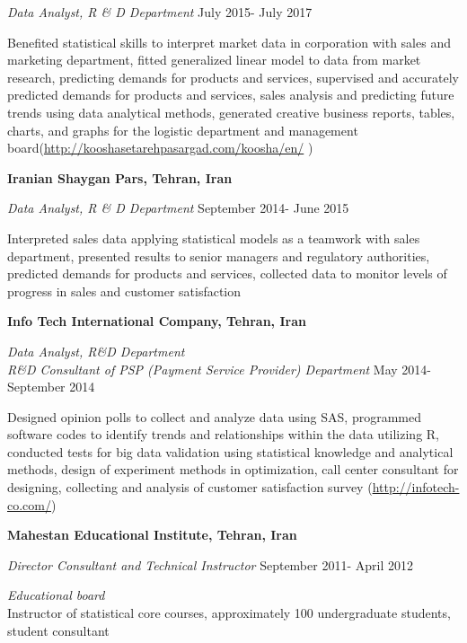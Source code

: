 \documentclass[margin,line]{res}
\begin{document}
\begin{resume}
{\em Data Analyst, R \& D Department} \hfill { July 2015- July 2017}

\vspace{-.3cm}
 Benefited statistical skills to interpret market data in corporation with sales and marketing department, fitted generalized linear model to data from market research, predicting demands for products and services, supervised and accurately predicted demands for products and services,  sales analysis and predicting future trends using data analytical methods,	generated creative business reports, tables, charts, and graphs for the logistic department and management board({\url{http://kooshasetarehpasargad.com/koosha/en/}} )



{\bf Iranian Shaygan Pars, Tehran, Iran }


{\em Data Analyst, R \& D Department} \hfill {  September 2014- June 2015}

\vspace{-.3cm}
Interpreted sales data applying statistical models as a teamwork with sales department,	presented results to senior managers and regulatory authorities, predicted demands for products and services, collected data to monitor levels of progress in sales and customer satisfaction


{\bf Info Tech International Company, Tehran, Iran }

{\em Data Analyst, R\&D Department\\ 
	 R\&D Consultant of PSP (Payment Service Provider) Department
} \hfill {  May 2014- September 2014}

\vspace{-.3cm}
Designed opinion polls to collect and analyze data using SAS, programmed software codes to identify trends and relationships within the data utilizing R, conducted tests for big data validation using statistical knowledge and analytical methods, design of experiment methods in optimization, call center consultant for designing, collecting and analysis of customer satisfaction survey 
({\url{http://infotech-co.com/}})


{\bf Mahestan Educational Institute, Tehran, Iran }

{\em Director Consultant and Technical Instructor} \hfill {  September 2011- April 2012 }

\vspace{-.3cm}
{\em Educational board}\\
Instructor of statistical core courses, approximately 100 undergraduate students, student consultant 
 




\end{resume}
\end{document}
